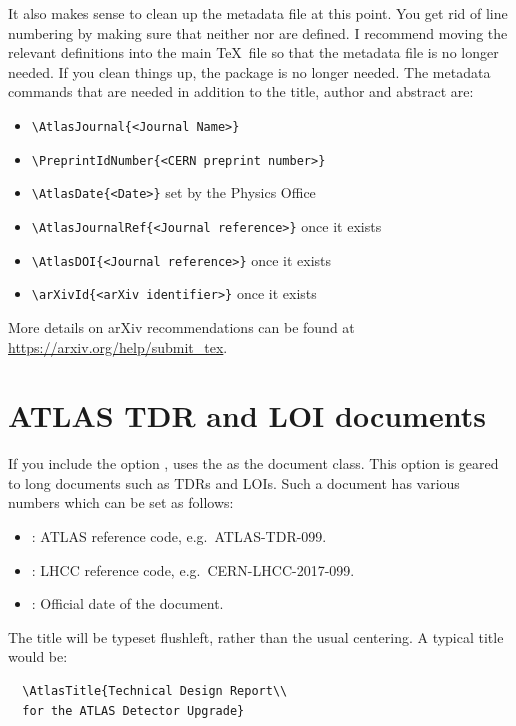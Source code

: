 It also makes sense to clean up the metadata file at this point.
You get rid of line numbering by making sure that neither  nor  are defined.
I recommend moving the relevant definitions into the main \TeX\ file so that the metadata file is no longer needed.
If you clean things up, the  package is no longer needed.
The metadata commands that are needed in addition to the title, author and abstract are:
\begin{itemize}
  \item {\verb|\AtlasJournal{<Journal Name>}|}
  \item {\verb|\PreprintIdNumber{<CERN preprint number>}|}
  \item {\verb|\AtlasDate{<Date>}|} set by the Physics Office
  \item {\verb|\AtlasJournalRef{<Journal reference>}|} once it exists
  \item {\verb|\AtlasDOI{<Journal reference>}|} once it exists
  \item {\verb|\arXivId{<arXiv identifier>}|} once it exists
\end{itemize}

More details on arXiv recommendations can be found at
\url{https://arxiv.org/help/submit_tex}.


\section{ATLAS TDR and LOI documents}
\label{sec:book}

If you include the option ,  uses the 
as the document class.
This option is geared to long documents such as TDRs and LOIs.
Such a document has various numbers which can be set as follows:
\begin{itemize}\setlength{\parskip}{0pt}\setlength{\itemsep}{0pt}
  \item {}: ATLAS reference code, e.g.\ ATLAS-TDR-099.
  \item {}: LHCC reference code, e.g.\ CERN-LHCC-2017-099.
  \item {}: Official date of the document.
\end{itemize}
The title will be typeset flushleft, rather than the usual centering.
A typical title would be:
\begin{verbatim}
  \AtlasTitle{Technical Design Report\\
  for the ATLAS Detector Upgrade}
\end{verbatim}

